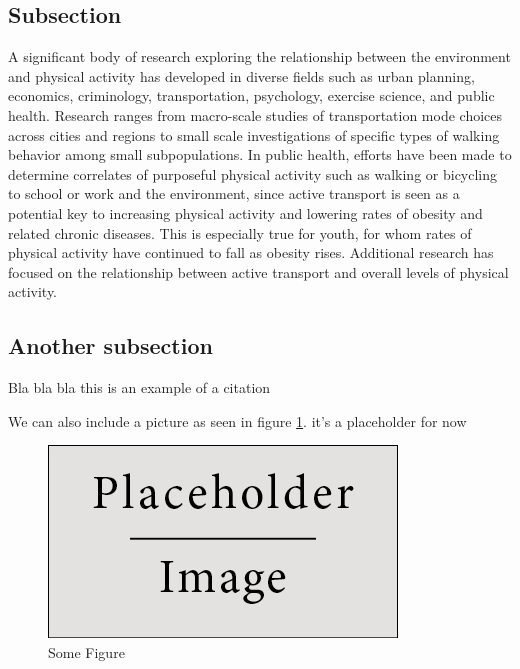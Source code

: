 \subsection*{Subsection}

A significant body of research exploring the relationship between the environment and physical activity has developed in diverse fields such as urban planning, economics, criminology, transportation, psychology, exercise science, and public health.  Research ranges from macro-scale studies of transportation mode choices across cities and regions to small scale investigations of specific types of walking behavior among small subpopulations.  In public health, efforts have been made to determine correlates of purposeful physical activity such as walking or bicycling to school or work and the environment, since active transport is seen as a potential key to increasing physical activity and lowering rates of obesity and related chronic diseases.  
This is especially true for youth, for whom rates of physical activity have continued to fall as obesity rises. Additional research has focused on the relationship between active transport and overall levels of physical activity.
  
\subsection*{Another subsection} %

Bla bla bla this is an example of a citation \cite{joe_dependence_2015}

We can also include a picture as seen in figure \ref{Fi:some_fig}. it's a placeholder for now

\begin{figure}
\begin{center}
\includegraphics[scale=.7]{fig/placeholder}
\caption{Some Figure}
\label{Fi:some_fig}
\end{center}
\end{figure}

